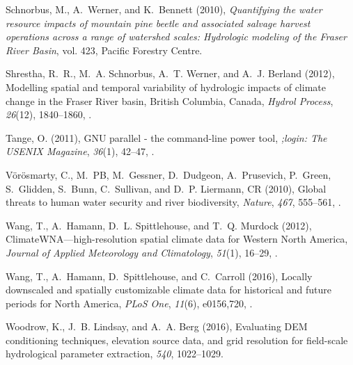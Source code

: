\documentclass{AGUJournal}
\begin{document}
\begin{thebibliography}{38}
Schnorbus, M., A.~Werner, and K.~Bennett (2010), \textit{Quantifying the water
  resource impacts of mountain pine beetle and associated salvage harvest
  operations across a range of watershed scales: Hydrologic modeling of the
  {F}raser {R}iver Basin}, vol. 423, Pacific Forestry Centre.

Shrestha, R.~R., M.~A. Schnorbus, A.~T. Werner, and A.~J. Berland (2012),
  Modelling spatial and temporal variability of hydrologic impacts of climate
  change in the {F}raser {R}iver basin, {B}ritish {C}olumbia, {C}anada, \textit{Hydrol
  Process}, \textit{26}(12), 1840--1860, .

Tange, O. (2011), {GNU} parallel - the command-line power tool, \textit{;login:
  The USENIX Magazine}, \textit{36}(1), 42--47,
  .

V{\"o}r{\"o}smarty, C., M.~{PB}, M.~Gessner, D.~Dudgeon, A.~Prusevich,
  P.~Green, S.~Glidden, S.~Bunn, C.~Sullivan, and D.~P. Liermann, {CR} (2010),
  Global threats to human water security and river biodiversity,
  \textit{Nature}, \textit{467}, 555--561, .

Wang, T., A.~Hamann, D.~L. Spittlehouse, and T.~Q. Murdock (2012),
  {ClimateWNA}---high-resolution spatial climate data for {W}estern {N}orth {A}merica,
  \textit{Journal of Applied Meteorology and Climatology}, \textit{51}(1),
  16--29, .

Wang, T., A.~Hamann, D.~Spittlehouse, and C.~Carroll (2016), Locally downscaled
  and spatially customizable climate data for historical and future periods for
  {North America}, \textit{PLoS One}, \textit{11}(6), e0156,720,
  .

Woodrow, K., J.~B. Lindsay, and A.~A. Berg (2016), Evaluating {DEM}
  conditioning techniques, elevation source data, and grid resolution for
  field-scale hydrological parameter extraction, \textit{540}, 1022--1029.


\end{thebibliography}
\end{document}
